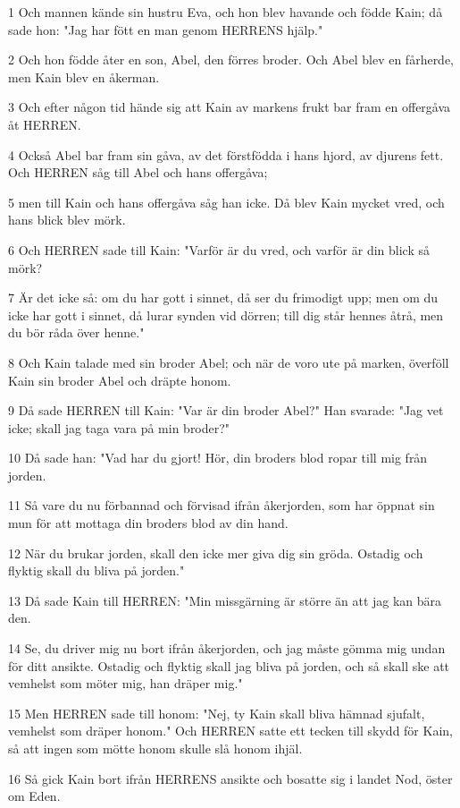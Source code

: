 \par 1 Och mannen kände sin hustru Eva, och hon blev havande och födde Kain; då sade hon: "Jag har fött en man genom HERRENS hjälp."
\par 2 Och hon födde åter en son, Abel, den förres broder. Och Abel blev en fårherde, men Kain blev en åkerman.
\par 3 Och efter någon tid hände sig att Kain av markens frukt bar fram en offergåva åt HERREN.
\par 4 Också Abel bar fram sin gåva, av det förstfödda i hans hjord, av djurens fett. Och HERREN såg till Abel och hans offergåva;
\par 5 men till Kain och hans offergåva såg han icke. Då blev Kain mycket vred, och hans blick blev mörk.
\par 6 Och HERREN sade till Kain: "Varför är du vred, och varför är din blick så mörk?
\par 7 Är det icke så: om du har gott i sinnet, då ser du frimodigt upp; men om du icke har gott i sinnet, då lurar synden vid dörren; till dig står hennes åtrå, men du bör råda över henne."
\par 8 Och Kain talade med sin broder Abel; och när de voro ute på marken, överföll Kain sin broder Abel och dräpte honom.
\par 9 Då sade HERREN till Kain: "Var är din broder Abel?" Han svarade: "Jag vet icke; skall jag taga vara på min broder?"
\par 10 Då sade han: "Vad har du gjort! Hör, din broders blod ropar till mig från jorden.
\par 11 Så vare du nu förbannad och förvisad ifrån åkerjorden, som har öppnat sin mun för att mottaga din broders blod av din hand.
\par 12 När du brukar jorden, skall den icke mer giva dig sin gröda. Ostadig och flyktig skall du bliva på jorden."
\par 13 Då sade Kain till HERREN: "Min missgärning är större än att jag kan bära den.
\par 14 Se, du driver mig nu bort ifrån åkerjorden, och jag måste gömma mig undan för ditt ansikte. Ostadig och flyktig skall jag bliva på jorden, och så skall ske att vemhelst som möter mig, han dräper mig."
\par 15 Men HERREN sade till honom: "Nej, ty Kain skall bliva hämnad sjufalt, vemhelst som dräper honom." Och HERREN satte ett tecken till skydd för Kain, så att ingen som mötte honom skulle slå honom ihjäl.
\par 16 Så gick Kain bort ifrån HERRENS ansikte och bosatte sig i landet Nod, öster om Eden.
